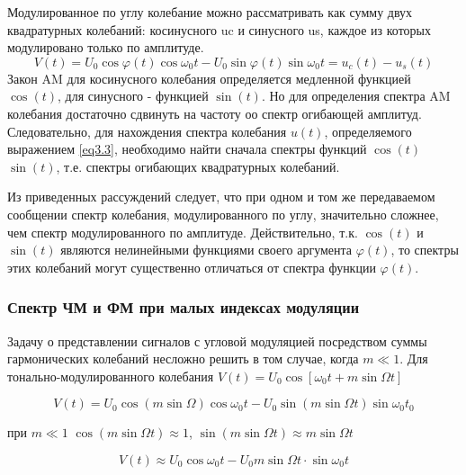 \documentclass[a4paper,12pt]{article}
\renewcommand{\phi}{\varphi}
\begin{document}
 Модулированное по углу колебание можно рассматривать как сумму двух квадратурных колебаний: косинусного uc и синусного us, каждое из которых модулировано только по амплитуде. 
\begin{equation}
\label{eq3.3}
	V(t)=U_{0} \cos \varphi(t) \cos \omega_{0} t-U_{0} \sin \varphi(t) \sin \omega_{0} t=u_{c}(t)-u_{s}(t)
\end{equation}
 Закон AM для косинусного колебания определяется медленной функцией $\cos(t)$, для синусного - функцией $\sin(t)$. Но для определения спектра AM колебания достаточно сдвинуть на частоту оо спектр огибающей амплитуд. Следовательно, для нахождения спектра колебания $u(t)$, определяемого выражением \eqref{eq3.3}, необходимо найти сначала спектры функций $\cos(t)$ $\sin(t)$, т.е. спектры огибающих квадратурных колебаний.

Из приведенных рассуждений следует, что при одном и том же передаваемом сообщении спектр колебания, модулированного по углу, значительно сложнее, чем спектр модулированного по амплитуде. Действительно, т.к. $\cos(t)$ и $\sin(t)$ являются нелинейными функциями своего аргумента $\phi(t)$, то спектры этих колебаний могут существенно отличаться от спектра функции $\phi(t)$.


\subsubsection{Спектр ЧМ и ФМ при малых индексах модуляции} %
	
Задачу о представлении сигналов с угловой модуляцией посредством суммы гармонических колебаний несложно решить в том случае, когда $m\ll 1$. Для тонально-модулированного колебания $V(t)=U_{0} \cos \left[\omega_{0} t+m\sin \Omega t\right]$

\begin{equation}
	V(t)=U_{0} \cos (m \sin \Omega) \cos \omega_{0} t-U_{0} \sin (m \sin \Omega t) \sin \omega_{0} t_{0}
\end{equation}

при $m\ll 1$ $\cos (m \sin \Omega t) \approx 1$, $\sin (m \sin \Omega t) \approx m \sin \Omega t$

\begin{equation}
	V(t) \approx U_{0} \cos \omega_{0} t-U_{0} m \sin \Omega t \cdot \sin \omega_{0} t
\end{equation}
\end{document}
